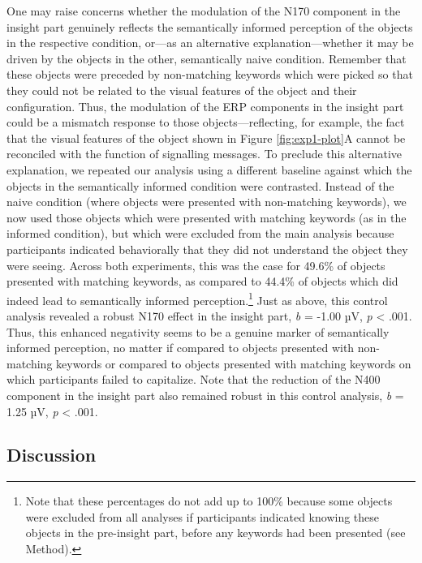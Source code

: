 \documentclass[
  english,
  doc,12pt,twoside,floatsintext]{apa7}
\begin{document}
One may raise concerns whether the modulation of the N170 component in the insight part genuinely reflects the semantically informed perception of the objects in the respective condition, or---as an alternative explanation---whether it may be driven by the objects in the other, semantically naive condition. Remember that these objects were preceded by non-matching keywords which were picked so that they could not be related to the visual features of the object and their configuration. Thus, the modulation of the ERP components in the insight part could be a mismatch response to those objects---reflecting, for example, the fact that the visual features of the object shown in Figure \ref{fig:exp1-plot}A cannot be reconciled with the function of signalling messages. To preclude this alternative explanation, we repeated our analysis using a different baseline against which the objects in the semantically informed condition were contrasted. Instead of the naive condition (where objects were presented with non-matching keywords), we now used those objects which were presented with matching keywords (as in the informed condition), but which were excluded from the main analysis because participants indicated behaviorally that they did not understand the object they were seeing. Across both experiments, this was the case for 49.6\% of objects presented with matching keywords, as compared to 44.4\% of objects which did indeed lead to semantically informed perception.\footnote{Note that these percentages do not add up to 100\% because some objects were excluded from all analyses if participants indicated knowing these objects in the pre-insight part, before any keywords had been presented (see Method).} Just as above, this control analysis revealed a robust N170 effect in the insight part, \emph{b} = -1.00 µV, \emph{p} \textless{} .001. Thus, this enhanced negativity seems to be a genuine marker of semantically informed perception, no matter if compared to objects presented with non-matching keywords or compared to objects presented with matching keywords on which participants failed to capitalize. Note that the reduction of the N400 component in the insight part also remained robust in this control analysis, \emph{b} = 1.25 µV, \emph{p} \textless{} .001.

\hypertarget{discussion-1}{%
\subsection{Discussion}\label{discussion-1}}
\end{document}
